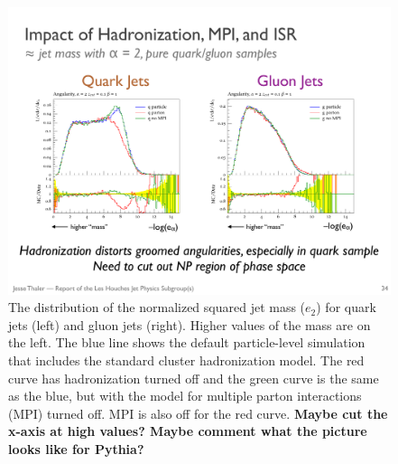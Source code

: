 \begin{figure}[h!]
\begin{center}
\includegraphics[width = 0.99\columnwidth]{figures/robustness.pdf}
\end{center}
\caption{The distribution of the normalized squared jet mass ($e_2$)
  for quark jets (left) and gluon jets (right).  Higher values of the
  mass are on the left.  The blue line shows the default
  particle-level simulation that includes the standard cluster
  hadronization model.  The red curve has hadronization turned off and
  the green curve is the same as the blue, but with the \herwig model
  for multiple parton interactions (MPI) turned off.  MPI is also off
  for the red curve.  \textbf{Maybe cut the x-axis at high values?
    Maybe comment what the picture looks like for Pythia?}}
\label{fig:robustness}
\end{figure}

